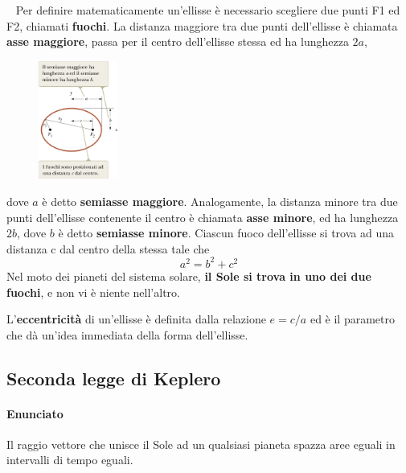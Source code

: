 \documentclass[a4paper,11pt,oneside]{book}
\begin{document}
~\newline
Per definire matematicamente un’ellisse è necessario scegliere due punti F1 ed F2, chiamati \textbf{fuochi}.
La distanza maggiore tra due punti dell’ellisse è chiamata \textbf{asse maggiore}, passa per il centro dell’ellisse stessa ed ha lunghezza $2a$, 
\begin{figure}
    \centering
    \includegraphics[width=0.23\textwidth]{ellisse_keplero.png}
\end{figure}
dove $a$ è detto \textbf{semiasse maggiore}. Analogamente, la distanza minore tra due 
punti dell’ellisse contenente il centro è chiamata \textbf{asse minore}, ed ha lunghezza $2b$, dove $b$ è detto \textbf{semiasse minore}.
Ciascun fuoco dell’ellisse si trova ad una distanza c dal centro della stessa tale che 
\begin{equation*}
    a^2 = b^2 + c^2
\end{equation*}
Nel moto dei pianeti del sistema solare, \textbf{il Sole si trova in uno dei due fuochi}, e non vi è niente nell’altro.

L’\textbf{eccentricità} di un’ellisse è definita dalla relazione $e = c/ a$ ed è il parametro che dà un’idea immediata della forma dell’ellisse. 

\subsection{Seconda legge di Keplero}
\paragraph{Enunciato} Il raggio vettore che unisce il Sole ad un qualsiasi pianeta spazza aree eguali in intervalli di tempo eguali.
\end{document}
